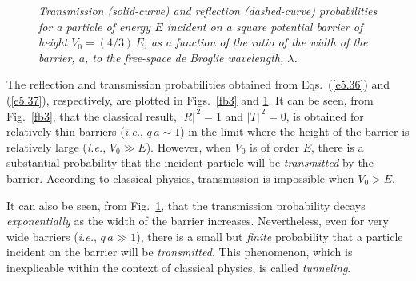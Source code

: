 \begin{figure}
\epsfysize=2.8in
\centerline{}
\caption{\em Transmission (solid-curve) and reflection (dashed-curve) probabilities for a particle of energy $E$ incident on  a square potential barrier of height $V_0 = (4/3)\,E$, as a function
of the ratio of the width of the barrier, $a$, to the free-space de Broglie
wavelength, $\lambda$.}\label{fb4}   
\end{figure}

The reflection  and transmission probabilities obtained from Eqs.~(\ref{e5.36}) and (\ref{e5.37}), respectively,  are plotted in Figs.~\ref{fb3} and
\ref{fb4}. It can be seen, from Fig.~\ref{fb3}, that the classical
result, $|R|^{\,2}=1$ and $|T|^{\,2}=0$, is obtained for relatively
thin barriers ({\em i.e.}, $q\,a\sim 1$) in the limit where the height of the barrier
is relatively large ({\em i.e.}, $V_0\gg E$). However, when $V_0$ is
of order $E$,  there is a substantial probability that the incident particle
will be {\em transmitted}\/ by the barrier. According to classical physics, transmission is impossible when $V_0 > E$. 

It can also be seen, from
Fig.~\ref{fb4}, that the transmission probability decays {\em exponentially}\/
as the width of the barrier increases. Nevertheless, even for very
wide barriers ({\em i.e.}, $q\,a\gg 1$), there is a small but {\em finite}\/
probability that a particle incident on the barrier will be
{\em transmitted}. This phenomenon, which is inexplicable within
the context of classical physics, is called {\em tunneling}. 

